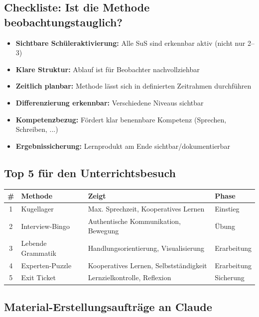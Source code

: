 \documentclass[11pt, a4paper]{article}
\begin{document}
\subsection*{Checkliste: Ist die Methode beobachtungstauglich?}

\begin{itemize}[label=$\square$, leftmargin=*]
    \item[$\square$] \textbf{Sichtbare Schüleraktivierung:} Alle SuS sind erkennbar aktiv (nicht nur 2--3)
    \item[$\square$] \textbf{Klare Struktur:} Ablauf ist für Beobachter nachvollziehbar
    \item[$\square$] \textbf{Zeitlich planbar:} Methode lässt sich in definierten Zeitrahmen durchführen
    \item[$\square$] \textbf{Differenzierung erkennbar:} Verschiedene Niveaus sichtbar
    \item[$\square$] \textbf{Kompetenzbezug:} Fördert klar benennbare Kompetenz (Sprechen, Schreiben, ...)
    \item[$\square$] \textbf{Ergebnissicherung:} Lernprodukt am Ende sichtbar/dokumentierbar
\end{itemize}

\subsection*{Top 5 für den Unterrichtsbesuch}

\begin{tabularx}{\textwidth}{|c|l|X|l|}
\hline
\textbf{\#} & \textbf{Methode} & \textbf{Zeigt} & \textbf{Phase} \\
\hline
1 & Kugellager & Max. Sprechzeit, Kooperatives Lernen & Einstieg \\
\hline
2 & Interview-Bingo & Authentische Kommunikation, Bewegung & Übung \\
\hline
3 & Lebende Grammatik & Handlungsorientierung, Visualisierung & Erarbeitung \\
\hline
4 & Experten-Puzzle & Kooperatives Lernen, Selbstständigkeit & Erarbeitung \\
\hline
5 & Exit Ticket & Lernzielkontrolle, Reflexion & Sicherung \\
\hline
\end{tabularx}

\vspace{2em}

\subsection*{Material-Erstellungsaufträge an Claude}
\end{document}
